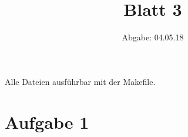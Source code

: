 

\usepackage{listings}
\usepackage[dvipsnames]{xcolor}

\title{Blatt 3}
\date{
  Abgabe: 04.05.18
}


\maketitle

Alle Dateien ausführbar mit der Makefile. %
\section*{Aufgabe 1}




